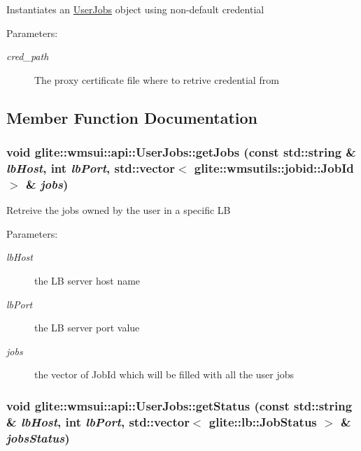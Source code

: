 Instantiates an \hyperlink{classglite_1_1wmsui_1_1api_1_1UserJobs}{User\-Jobs} object using non-default credential \begin{Desc}
\item[Parameters:]
\begin{description}
\item[{\em cred\_\-path}]The proxy certificate file where to retrive credential from \end{description}
\end{Desc}


\subsection{Member Function Documentation}
\hypertarget{classglite_1_1wmsui_1_1api_1_1UserJobs_z29_0}{
\subsubsection[getJobs]{\setlength{\rightskip}{0pt plus 5cm}void glite::wmsui::api::User\-Jobs::get\-Jobs (const std::string \& {\em lb\-Host}, int {\em lb\-Port}, std::vector$<$ glite::wmsutils::jobid::Job\-Id $>$ \& {\em jobs})}}
\label{classglite_1_1wmsui_1_1api_1_1UserJobs_z29_0}


Retreive the jobs owned by the user in a specific LB \begin{Desc}
\item[Parameters:]
\begin{description}
\item[{\em lb\-Host}]the LB server host name \item[{\em lb\-Port}]the LB server port value \item[{\em jobs}]the vector of Job\-Id which will be filled with all the user jobs\end{description}
\end{Desc}
\hypertarget{classglite_1_1wmsui_1_1api_1_1UserJobs_z29_1}{
\subsubsection[getStatus]{\setlength{\rightskip}{0pt plus 5cm}void glite::wmsui::api::User\-Jobs::get\-Status (const std::string \& {\em lb\-Host}, int {\em lb\-Port}, std::vector$<$ glite::lb::Job\-Status $>$ \& {\em jobs\-Status})}}
\label{classglite_1_1wmsui_1_1api_1_1UserJobs_z29_1}


